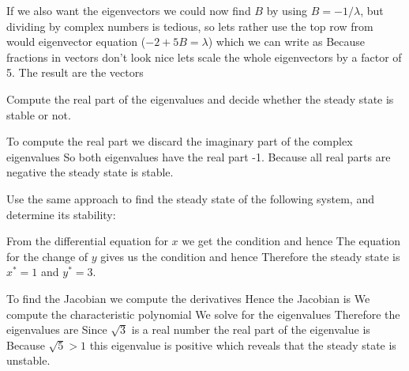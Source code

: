  If we also want the eigenvectors we could now find $B$ by  using $B=-1/\lambda$, but dividing by complex numbers is tedious, so lets rather use the top row from would eigenvector equation ($-2+5B=\lambda$) which we can write as 
Because fractions in vectors don't look nice lets scale the whole eigenvectors by a factor of 5. The result are the vectors 

\subquestion 
Compute the real part of the eigenvalues and decide whether the steady state is stable or not. 

\solution 
To compute the real part we discard the imaginary part of the complex eigenvalues  
So both eigenvalues have the real part -1. Because all real parts are negative the steady state is stable.  

\subquestion 
Use the same approach to find the steady state of the following system, and determine its stability:

\solution 
From the differential equation for $x$ we get the condition 
and hence 
The equation for the change of $y$ gives us the condition 
and hence 
Therefore the steady state is $x^*=1$ and $y^*=3$.

To find the Jacobian we compute the derivatives 
Hence the Jacobian is 
We compute the characteristic polynomial 
We solve for the eigenvalues 
Therefore the eigenvalues are 
Since $\sqrt{3}$ is a real number the real part of the eigenvalue is 
Because $\sqrt{5}>1$ this eigenvalue is positive which reveals that the steady state is unstable. 
